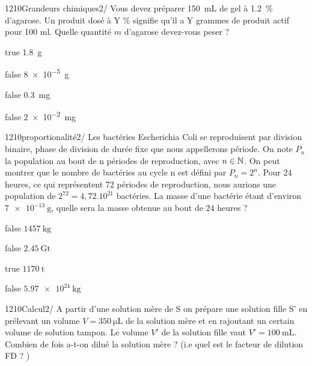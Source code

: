 \documentclass[11pt]{article}
\begin{document}
            \begin{question}{1210}{Grandeurs chimiques}{2}{/}
				  Vous devez préparer \SI{150}{mL} de gel à \SI{1.2}{\percent} d’agarose. Un produit dosé à Y \% signifie qu'il a Y grammes de produit actif pour 100 ml. Quelle quantité $m$ d’agarose devez-vous peser ?

            \end{question}

            \begin{reponses}
            	\item[true]  \SI{1.8}{\gram}
            	\item[false]  \SI{8e-5}{\gram}
                \item[false]  \SI{0.3}{\milli\gram}
                \item[false]   \SI{2e-2}{\milli\gram}
            \end{reponses}
			
			
			
			\begin{question}{1210}{proportionalité}{2}{/}
		        Les bactéries Escherichia Coli se reproduisent par division binaire, phase de division de durée fixe que nous appellerons période. On note $P_n$ la population au bout de n périodes de reproduction, avec $n \in \mathbb {N}  $. On peut montrer que le nombre de bactéries au cycle n est défini par $P_n = 2^n$. Pour 24 heures, ce qui représentent 72 périodes de reproduction, nous aurions une population de $2^{72} = 4,72.10^{21}$ bactéries. La masse d’une bactérie étant d’environ $\SI{7e-13}{\gram}$, quelle sera la masse obtenue au bout de 24 heures ? 

            \end{question}

            \begin{reponses}
            	\item[false]  $ \SI{1457}{\kilo\gram} $
            	\item[false]  $ \SI{2.45}{\giga\tonne} $
                \item[true]  $ \SI{1170}{\tonne} $
                \item[false]   $ \SI{5,97e24}{\kilo\gram} $
            \end{reponses}
			
			\begin{question}{1210}{Calcul}{2}{/}
				 A partir d’une solution mère de S on prépare une solution fille S' en prélevant un volume $V = \SI{350}{\micro\liter}$ de la solution mère et en rajoutant un certain volume de solution tampon. Le volume $V'$ de la solution fille vaut $V' = \SI{100}{\milli\liter}$. Combien de fois a-t-on dilué la solution mère ? (i.e quel est le facteur de dilution FD ? ) 
                 

            \end{question}
\end{document}
